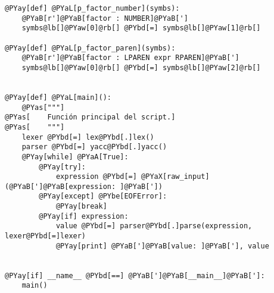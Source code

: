 \begin{Verbatim}[commandchars=@\[\]]
@PYay[def] @PYaL[p_factor_number](symbs):
    @PYaB[r']@PYaB[factor : NUMBER]@PYaB[']
    symbs@lb[]@PYaw[0]@rb[] @PYbd[=] symbs@lb[]@PYaw[1]@rb[]
    
@PYay[def] @PYaL[p_factor_paren](symbs):
    @PYaB[r']@PYaB[factor : LPAREN expr RPAREN]@PYaB[']
    symbs@lb[]@PYaw[0]@rb[] @PYbd[=] symbs@lb[]@PYaw[2]@rb[]


@PYay[def] @PYaL[main]():
    @PYas["""]
@PYas[    Función principal del script.]
@PYas[    """]
    lexer @PYbd[=] lex@PYbd[.]lex()
    parser @PYbd[=] yacc@PYbd[.]yacc()
    @PYay[while] @PYaA[True]:
        @PYay[try]:
            expression @PYbd[=] @PYaX[raw_input](@PYaB[']@PYaB[expression: ]@PYaB['])
        @PYay[except] @PYbe[EOFError]:
            @PYay[break]
        @PYay[if] expression:
            value @PYbd[=] parser@PYbd[.]parse(expression, lexer@PYbd[=]lexer)
            @PYay[print] @PYaB[']@PYaB[value: ]@PYaB['], value


@PYay[if] __name__ @PYbd[==] @PYaB[']@PYaB[__main__]@PYaB[']:
    main()
\end{Verbatim}
